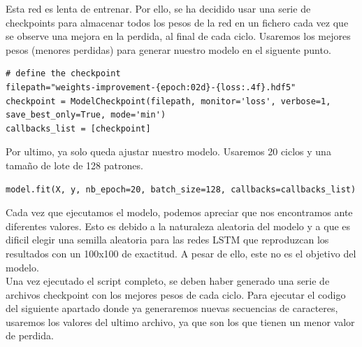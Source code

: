 Esta red es lenta de entrenar. Por ello, se ha decidido usar una serie de checkpoints para almacenar todos los pesos de la red en un fichero cada vez que se observe una mejora en la perdida, al final de cada ciclo. Usaremos los mejores pesos (menores perdidas) para generar nuestro modelo en el siguente punto.
\begin{verbatim}
# define the checkpoint
filepath="weights-improvement-{epoch:02d}-{loss:.4f}.hdf5"
checkpoint = ModelCheckpoint(filepath, monitor='loss', verbose=1, save_best_only=True, mode='min')
callbacks_list = [checkpoint]
\end{verbatim}
Por ultimo, ya solo queda ajustar nuestro modelo. Usaremos 20 ciclos y una tamaño de lote de 128 patrones.
\begin{verbatim}
model.fit(X, y, nb_epoch=20, batch_size=128, callbacks=callbacks_list)
\end{verbatim}
Cada vez que ejecutamos el modelo, podemos apreciar que nos encontramos ante diferentes valores. Esto es debido a la naturaleza aleatoria del modelo y a que es dificil elegir una semilla aleatoria para las redes LSTM que reproduzcan los resultados con un 100x100 de exactitud. A pesar de ello, este no es el objetivo del modelo.\\
Una vez ejecutado el script completo, se deben haber generado una serie de archivos checkpoint con los mejores pesos de cada ciclo. Para ejecutar el codigo del siguiente apartado donde ya generaremos nuevas secuencias de caracteres, usaremos los valores del ultimo archivo, ya que son los que tienen un menor valor de perdida.
